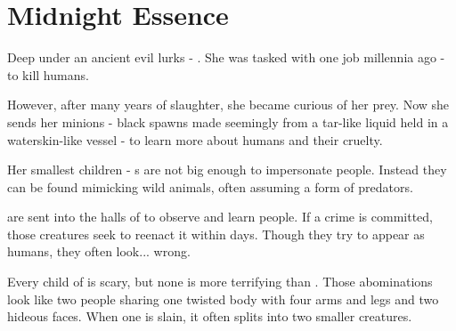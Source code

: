 \section{Midnight Essence}
\label{enemyFractionMidnight}

Deep under \locationUrithiru{} an ancient evil lurks - \npcMidnightMotherFull{}. She was tasked with one job millennia ago - to kill humans.

However, after many years of slaughter, she became curious of her prey. Now she sends her minions - black spawns made seemingly from a tar-like liquid held in a waterskin-like vessel - to learn more about humans and their cruelty. 

Her smallest children - \enemyMidnightBeast{}s are not big enough to impersonate people. Instead they can be found mimicking wild animals, often assuming a form of predators.

\enemyMidnightAssassin{} are sent into the halls of \locationUrithiru{} to observe and learn people. If a crime is committed, those creatures seek to reenact it within days. Though they try to appear as humans, they often look... wrong.

Every child of \npcMidnightMother{} is scary, but none is more terrifying than \enemyMidnightTwin{}. Those abominations look like two people sharing one twisted body with four arms and legs and two hideous faces. When one is slain, it often splits into two smaller creatures.


\newpage

\newpage

\newpage
